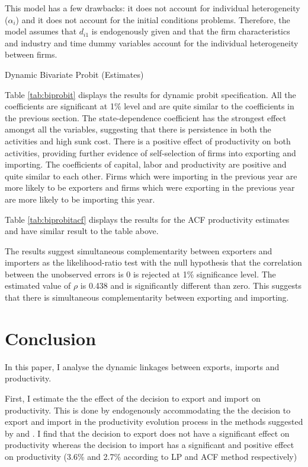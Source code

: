 \documentclass[12pt]{article}
\begin{document}
This model has a few drawbacks: it does not account for individual
heterogeneity ($\alpha_{i}$) and it does not account for the  initial
conditions problems. Therefore, the model assumes that $d_{i1}$ is 
endogenously given and that the firm characteristics and industry and time  dummy variables account
for the individual heterogeneity between firms.
\begin{center}
\begin{table}[H]
\caption{Dynamic Bivariate Probit (Estimates)}
\label{tab:biprobit}

\end{table}
\end{center} 
Table \ref{tab:biprobit} displays the results for dynamic probit specification. All
  the coefficients are significant at 1\% level and are quite similar
  to the coefficients in the previous section.  The
  state-dependence coefficient has the strongest effect amongst all
  the variables, suggesting that there is persistence in both the
  activities and high sunk cost. There is a positive effect of 
  productivity on both activities, providing further evidence of
  self-selection of firms into exporting and importing. The
  coefficients of capital, labor and productivity are positive and
  quite similar to each other. Firms which were importing in the previous year are more
  likely to be exporters and firms which were exporting in the
  previous year are more likely to be importing this year.

Table \ref{tab:biprobitacf} displays the results for the ACF
productivity estimates and have  similar result to the table
above. 
 
The results suggest  simultaneous complementarity between exporters and
  importers as the likelihood-ratio test with the null hypothesis that
  the correlation between the unobserved errors is 0 is rejected at
  1\% significance level. The estimated value of $\rho$ is 0.438 and
  is significantly different than zero. This suggests that there is
  simultaneous complementarity between exporting and importing. 
\section{Conclusion}\label{ref:conclusion}
In this paper, I analyse the dynamic linkages between exports, imports
and productivity.  

First, I estimate the the effect of the decision to export and import
on productivity. This is done by endogenously accommodating the the
decision to export and import in the productivity evolution process in
the methods suggested by \textcite{levinsohn2003estimating} and
\textcite{ackerberg2006structural}. I find that the decision to export
does not have a significant effect on productivity whereas the
decision to import has a significant and positive effect  on
productivity (3.6\% and 2.7\% according to LP and ACF method respectively) 
\end{document}

